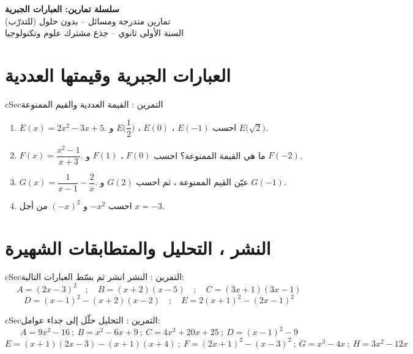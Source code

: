 \documentclass[12pt,a4paper]{article}
\newenvironment{BOX}[2]{\begin{otherlanguage}{english}\begin{arbox}{#1}{#2}}{\end{arbox}\end{otherlanguage}}
\newcounter{exo}
\newenvironment{tamrin}[1]{\stepcounter{exo}\begin{BOX}{cSec}{التمرين \theexo: #1}}{\end{BOX}}
\newenvironment{LTR}{\begin{otherlanguage}{english}}{\end{otherlanguage}}
\begin{document}
\begin{LTR}
\begin{tcolorbox}[enhanced,colback=cSec!10,colframe=cSec!40,arc=3mm,halign=center,boxrule=0.6pt,top=12pt,bottom=12pt,before upper={\selectlanguage{arabic}}]
{\color{cSec}\fontsize{26}{32}\selectfont\bfseries سلسلة تمارين: العبارات الجبرية}\\[8pt]
{\color{cSec!80!black}\large تمارين متدرجة ومسائل -- بدون حلول (للتدرّب)}\\[5pt]
{\color{cSec!80!black}\large السنة الأولى ثانوي -- جذع مشترك علوم وتكنولوجيا}
\end{tcolorbox}
\end{LTR}

\section{العبارات الجبرية وقيمتها العددية}
\begin{tamrin}{القيمة العددية والقيم الممنوعة}
\begin{enumerate}
\item $E(x)=2x^2-3x+5$. احسب $E(-1)$ ، $E(0)$ ، $E\Big(\dfrac12\Big)$ و $E\big(\sqrt2\big)$.
\item $F(x)=\dfrac{x^2-1}{x+3}$. ما هي القيمة الممنوعة؟ احسب $F(0)$ ، $F(1)$ و $F(-2)$.
\item $G(x)=\dfrac1{x-1}-\dfrac2x$. عيّن القيم الممنوعة ، ثم احسب $G(2)$ و $G(-1)$.
\item احسب $-x^2$ و $(-x)^2$ من أجل $x=-3$.
\end{enumerate}
\end{tamrin}

\section{النشر ، التحليل والمتطابقات الشهيرة}
\begin{tamrin}{النشر}
انشر ثم بسّط العبارات التالية:
\[A=(2x-3)^2\quad;\quad B=(x+2)(x-5)\quad;\quad C=(3x+1)(3x-1)\]
\[D=(x-1)^2-(x+2)(x-2)\quad;\quad E=2(x+1)^2-(2x-1)^2\]
\end{tamrin}

\begin{tamrin}{التحليل}
حلّل إلى جداء عوامل:
\[A=9x^2-16\ ;\ B=x^2-6x+9\ ;\ C=4x^2+20x+25\ ;\ D=(x-1)^2-9\]
\[E=(x+1)(2x-3)-(x+1)(x+4)\ ;\ F=(2x+1)^2-(x-3)^2\ ;\ G=x^3-4x\ ;\ H=3x^2-12x\]
\end{tamrin}
\end{document}
